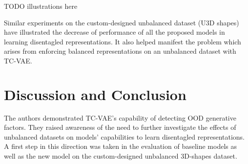 \documentclass[twoside,11pt]{article}
\begin{document}
TODO illustrations here

Similar experiments on the custom-designed unbalanced dataset (U3D shapes) have illustrated the decrease of performance of all the proposed models in learning disentagled representations. It also helped manifest the problem which arises from enforcing balanced representations on an unbalanced dataset with TC-VAE.

\section{Discussion and Conclusion}
The authors demonstrated TC-VAE's capability of detecting OOD generative factors. They raised awareness of the need to further investigate the effects of unbalanced datasets on models' capabilities to learn disentagled representations.
A first step in this direction was taken in the evaluation of baseline models as well as the new model on the custom-designed unbalanced 3D-shapes dataset.






\newpage



\nocite{*}

\end{document}
